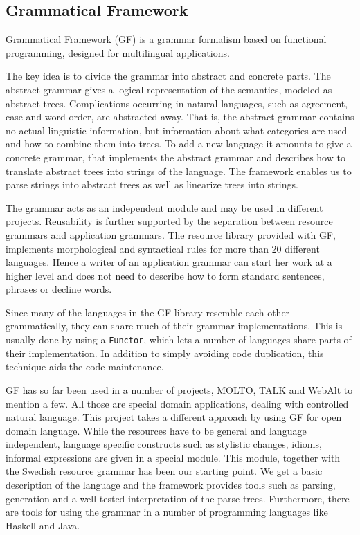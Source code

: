 \documentclass[submission]{eptcs} %
\begin{document}
\subsection{Grammatical Framework}
\label{sec:gf}


Grammatical Framework\cite{ranta-2011} (GF) is a grammar formalism based on functional
programming, designed for multilingual applications.

The key idea is to divide the grammar into abstract and concrete parts. %
The abstract grammar gives a logical representation of the semantics,
modeled as abstract trees. Complications occurring in
natural languages, such as agreement, case and word order, are abstracted away. 
That is, the abstract grammar contains no actual linguistic information, but
information about what categories are used and how to combine them into trees.
To add a new language it amounts to give a concrete grammar, that implements
the abstract grammar and describes how to translate abstract
trees into strings of the language. The framework enables us to parse strings into 
abstract trees as well as linearize trees into strings.

The grammar acts as an independent module and may be used in different
projects.
Reusability is further supported by the separation between resource grammars
and application grammars. The resource library provided with GF, 
implements morphological and
syntactical rules for more than 20 different languages.
Hence a writer of an application grammar can start her work at a higher
level and does not need to describe how to 
form standard sentences, phrases or decline words.

Since many of the languages in the GF library resemble each other grammatically,
they can share much of their grammar implementations. This is usually done by using a
\verb|Functor|, which lets a number of languages share parts of their implementation. 
In addition to simply avoiding code duplication, this technique aids the code maintenance.

GF has so far been used in a number of projects, MOLTO\cite{molto}, TALK\cite{talk}
and WebAlt\cite{webalt} to mention a few. 
All those are special domain applications, dealing with controlled natural
language.
This project takes a different approach by using GF for open domain language.
While the resources have to be general and language independent,
language specific constructs such as stylistic changes, idioms, informal
expressions are given in a special module.
This module, together with the Swedish resource grammar has been our starting
point. %
We get a basic description of the language and the framework provides
tools such as parsing, generation and
a well-tested interpretation of the parse trees. Furthermore, there are tools
for using the grammar in a number of programming languages like Haskell
and Java. 
\end{document}
